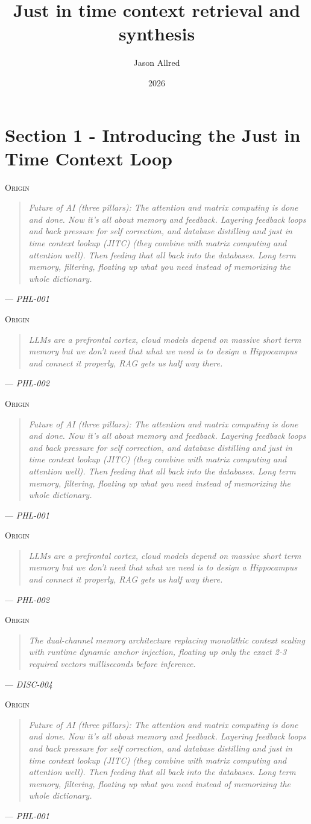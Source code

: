\documentclass[11pt]{article}
\title{Just in time context retrieval and synthesis}
\author{Jason Allred}
\date{2026}
\newcommand{\originquote}[1]{%
  \begin{quote}
  \textit{#1}
  \end{quote}
}
\newcommand{\originmark}{%
  \textsc{Origin}\enspace
}
\begin{document}
\maketitle
\section{Section 1 - Introducing the Just in Time Context Loop}
\noindent\originmark
\originquote{Future of AI (three pillars): The attention and matrix computing is done and done. Now it's all about memory and feedback. Layering feedback loops and back pressure for self correction, and database distilling and just in time context lookup (JITC) (they combine with matrix computing and attention well). Then feeding that all back into the databases. Long term memory, filtering, floating up what you need instead of memorizing the whole dictionary.}
\hfill --- \textit{PHL-001}

\noindent\originmark
\originquote{LLMs are a prefrontal cortex, cloud models depend on massive short term memory but we don’t need that what we need is to design a Hippocampus and connect it properly, RAG gets us half way there.}
\hfill --- \textit{PHL-002}

\noindent\originmark
\originquote{Future of AI (three pillars): The attention and matrix computing is done and done. Now it's all about memory and feedback. Layering feedback loops and back pressure for self correction, and database distilling and just in time context lookup (JITC) (they combine with matrix computing and attention well). Then feeding that all back into the databases. Long term memory, filtering, floating up what you need instead of memorizing the whole dictionary.}
\hfill --- \textit{PHL-001}

\noindent\originmark
\originquote{LLMs are a prefrontal cortex, cloud models depend on massive short term memory but we don’t need that what we need is to design a Hippocampus and connect it properly, RAG gets us half way there.}
\hfill --- \textit{PHL-002}

\noindent\originmark
\originquote{The dual-channel memory architecture replacing monolithic context scaling with runtime dynamic anchor injection, floating up only the exact 2-3 required vectors milliseconds before inference.}
\hfill --- \textit{DISC-004}

\noindent\originmark
\originquote{Future of AI (three pillars): The attention and matrix computing is done and done. Now it's all about memory and feedback. Layering feedback loops and back pressure for self correction, and database distilling and just in time context lookup (JITC) (they combine with matrix computing and attention well). Then feeding that all back into the databases. Long term memory, filtering, floating up what you need instead of memorizing the whole dictionary.}
\hfill --- \textit{PHL-001}
\end{document}
